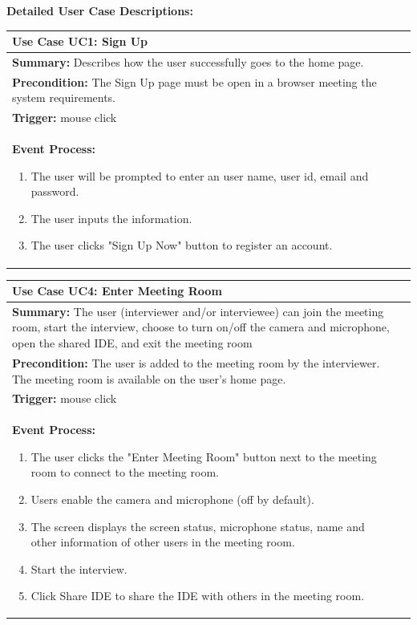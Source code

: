 \documentclass{article}
\begin{document}
   \textbf{Detailed User Case Descriptions: }\par

   \begin{tabularx}{0.9\textwidth} { 
    | >{\raggedright\arraybackslash}X 
    | >{\centering\arraybackslash}X | }
   \hline
   \textbf{Use Case UC1: Sign Up} \\
   \hline
   \textbf{Summary:} Describes how the user successfully goes to the home page. \\
   \hline
   \textbf{Precondition:} The Sign Up page must be open in a browser meeting the system requirements.\\
   \hline
   \textbf{Trigger:} mouse click\\
   \hline
   \textbf{Event Process:}
   \begin{enumerate}
    \item The user will be prompted to enter an user name, user id, email and password.
    \item The user inputs the information.
    \item The user clicks "Sign Up Now" button to register an account.
   \end{enumerate}\\
   \hline
  \end{tabularx}

   \begin{tabularx}{0.9\textwidth} { 
    | >{\raggedright\arraybackslash}X 
    | >{\centering\arraybackslash}X | }
   \hline
   \textbf{Use Case UC4: Enter Meeting Room} \\
   \hline
   \textbf{Summary:} The user (interviewer and/or interviewee) can join the meeting room, start the interview, choose to turn on/off the camera and microphone, open the shared IDE, and exit the meeting room \\
   \hline
   \textbf{Precondition:} The user is added to the meeting room by the interviewer. The meeting room is available on the user's home page.\\
   \hline
   \textbf{Trigger:} mouse click\\
   \hline
   \textbf{Event Process:}
   \begin{enumerate}
    \item The user clicks the "Enter Meeting Room" button next to the meeting room to connect to the meeting room.
    \item Users enable the camera and microphone (off by default).
    \item The screen displays the screen status, microphone status, name and other information of other users in the meeting room.
    \item Start the interview.
    \item Click Share IDE to share the IDE with others in the meeting room.
   \end{enumerate}\\
   \hline
  \end{tabularx}
\end{document}
